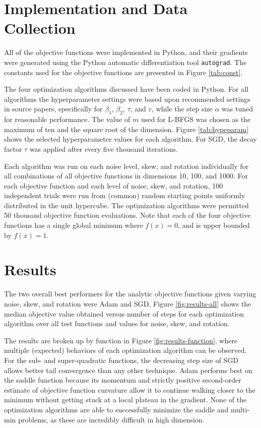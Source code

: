 \documentclass[letterpaper, 10 pt, conference]{IEEEtran}  %
\begin{document}
\section{Implementation and Data Collection}

All of the objective functions were implemented in Python, and their
gradients were generated using the Python automatic differentiation
tool {\tt autograd}.  The constants used for the objective functions
are presented in Figure \ref{tab:const}.

The four optimization algorithms discussed have been coded in Python.
For all algorithms the hyperparameter settings were based upon
recommended settings in source papers, specifically for $\beta_1$,
$\beta_2$, $\tau$, and $\varepsilon$, while the step size $\alpha$ was
tuned for reasonable performance. The value of $m$ used for L-BFGS
was chosen as the maximum of ten and the square root of the
dimension. Figure \ref{tab:hypeparam} shows the selected hyperparameter
values for each algorithm.  For SGD, the decay factor $\tau$ was
applied after every five thousand iterations.

Each algorithm was run on each noise level, skew, and rotation
individually for all combinations of all objective functions in
dimensions 10, 100, and 1000. For each objective function and each
level of noise, skew, and rotation, 100 independent trials were run
from (common) random starting points uniformly distributed in the unit
hypercube. The optimization algorithms were permitted 50 thousand
objective function evaluations. Note that each of the four objective
functions has a single global minimum where $f(x) = 0$, and is upper
bounded by $f(x) = 1$.

\section{Results}

The two overall best performers for the analytic objective functions
given varying noise, skew, and rotation were Adam and SGD.  Figure
\ref{fig:results-all} shows the median objective value obtained versus
number of steps for each optimization algorithm over all test
functions and values for noise, skew, and rotation.

The results are broken up by function in Figure
\ref{fig:results-function}, where multiple (expected) behaviors of
each optimization algorithm can be observed. For the sub- and
super-quadratic functions, the decreasing step size of SGD allows
better tail convergence than any other technique. Adam performs best
on the saddle function because its momentum and strictly positive
second-order estimate of objective function curvature allow it to
continue walking closer to the minimum without getting stuck at a
local plateau in the gradient. None of the optimization algorithms are
able to successfully minimize the saddle and multi-min problems, as
these are incredibly difficult in high dimension.
\end{document}
